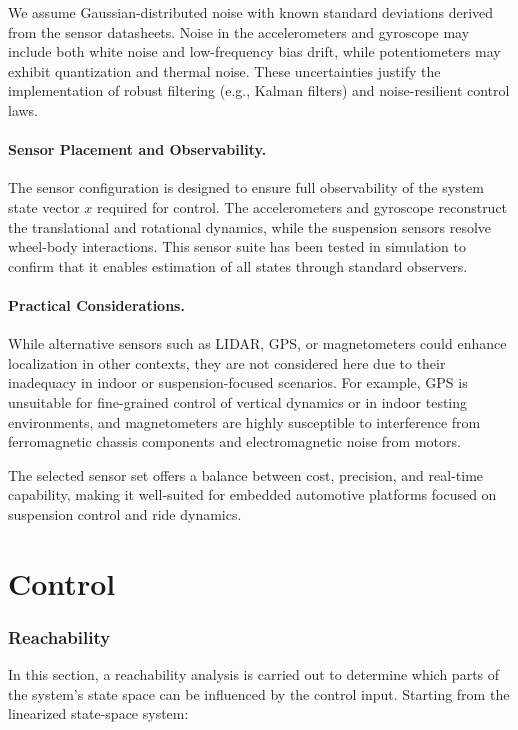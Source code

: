 \documentclass[]{report}
\begin{document}
We assume Gaussian-distributed noise with known standard deviations derived from the sensor datasheets. Noise in the accelerometers and gyroscope may include both white noise and low-frequency bias drift, while potentiometers may exhibit quantization and thermal noise. These uncertainties justify the implementation of robust filtering (e.g., Kalman filters) and noise-resilient control laws.

\paragraph{Sensor Placement and Observability.}
The sensor configuration is designed to ensure full observability of the system state vector $x$ required for control. The accelerometers and gyroscope reconstruct the translational and rotational dynamics, while the suspension sensors resolve wheel-body interactions. This sensor suite has been tested in simulation to confirm that it enables estimation of all states through standard observers.

\paragraph{Practical Considerations.}
While alternative sensors such as LIDAR, GPS, or magnetometers could enhance localization in other contexts, they are not considered here due to their inadequacy in indoor or suspension-focused scenarios. For example, GPS is unsuitable for fine-grained control of vertical dynamics or in indoor testing environments, and magnetometers are highly susceptible to interference from ferromagnetic chassis components and electromagnetic noise from motors.

The selected sensor set offers a balance between cost, precision, and real-time capability, making it well-suited for embedded automotive platforms focused on suspension control and ride dynamics.

\section{Control}

\subsubsection{Reachability}

In this section, a reachability analysis is carried out to determine which parts of the system's state space can be influenced by the control input. Starting from the linearized state-space system:
\end{document}
